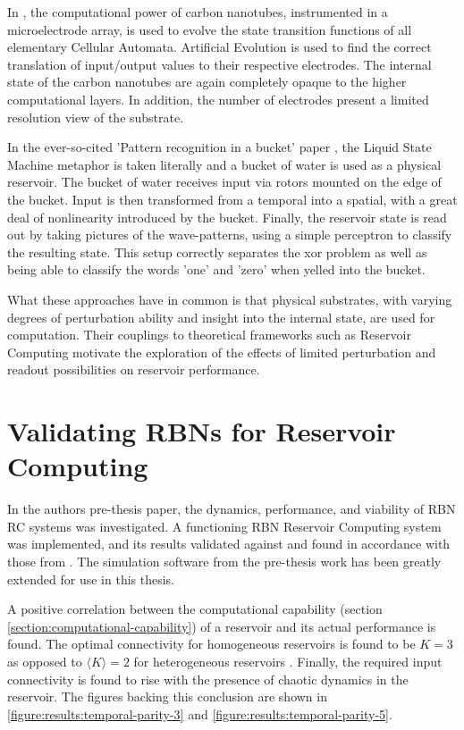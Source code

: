 In \cite{farstad2015evolving}, the computational power of carbon nanotubes,
instrumented in a microelectrode array,
is used to evolve the state transition functions of all elementary Cellular Automata.
Artificial Evolution is used to find the correct translation of input/output values to their respective electrodes.
The internal state of the carbon nanotubes are again completely opaque to the higher computational layers.
In addition, the number of electrodes present a limited resolution view of the substrate.

In the ever-so-cited 'Pattern recognition in a bucket' paper \cite{fernando2003pattern},
the Liquid State Machine metaphor is taken literally and a bucket of water is used as a physical reservoir.
The bucket of water receives input via rotors mounted on the edge of the bucket.
Input is then transformed from a temporal into a spatial, with a great deal of nonlinearity introduced by the bucket.
Finally, the reservoir state is read out by taking pictures of the wave-patterns,
using a simple perceptron to classify the resulting state.
This setup correctly separates the xor problem as well as being able to classify the words 'one' and 'zero' when yelled into the bucket.

What these approaches have in common is that physical substrates,
with varying degrees of perturbation ability and insight into the internal state,
are used for computation.
Their couplings to theoretical frameworks such as Reservoir Computing motivate the exploration of the effects of limited perturbation and readout possibilities on reservoir performance.

\section{Validating RBNs for Reservoir Computing}
\label{section:pre-thesis-project}

In the authors pre-thesis paper, the dynamics, performance, and viability of RBN RC systems was investigated.
A functioning RBN Reservoir Computing system was implemented,
and its results validated against and found in accordance with those from \cite{rbn-reservoir}.
The simulation software from the pre-thesis work has been greatly extended for use in this thesis.

A positive correlation between the computational capability (section \ref{section:computational-capability}) of a reservoir and its actual performance is found.
The optimal connectivity for homogeneous reservoirs is found to be $K=3$ as opposed to $\langle K \rangle = 2$ for heterogeneous reservoirs \cite{rbn-reservoir}.
Finally, the required input connectivity is found to rise with the presence of chaotic dynamics in the reservoir.
The figures backing this conclusion are shown in \ref{figure:results:temporal-parity-3} and \ref{figure:results:temporal-parity-5}.

